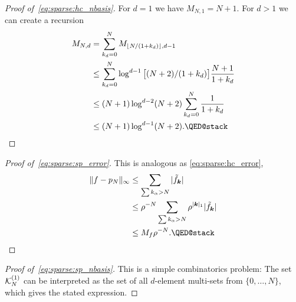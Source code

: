 \begin{proof}[Proof of~\eqref{eq:sparse:hc_nbasis}]
    For $d = 1$ we have $M_{N,1} = N+1$. For $d > 1$ we can create a 
    recursion 
    \begin{align*}
        M_{N,d} 
        &= \sum_{k_{d} = 0}^N M_{\lfloor N/(1+k_d) \rfloor, d-1} \\ 
        &\leq \sum_{k_d = 0}^N \log^{d-1} \b[ (N+2)/(1+k_d) \b] \frac{N+1}{1+k_d} \\ 
        &\leq (N+1) \log^{d-2} (N+2) \sum_{k_d = 0}^N \frac{1}{1+k_d} \\ 
        &\leq (N+1) \log^{d-1} (N+2).  \qedhere 
    \end{align*}
\end{proof}

\begin{proof}[Proof of~\ref{eq:sparse:sp_error}]
    This is analogous as  \eqref{eq:sparse:hc_error}, 
    \begin{align*}
        \|f - p_N\|_\infty 
        &\leq \sum_{\sum k_\alpha > N} |\tilde{f}_\bk| \\ 
        &\leq \rho^{-N} \sum_{\sum k_\alpha > N} \rho^{|\bk|_1} |\tilde{f}_\bk| \\ 
        &\leq M_f \rho^{-N}. \qedhere 
    \end{align*}
\end{proof}
\begin{proof}[Proof of~\eqref{eq:sparse:sp_nbasis}]
    This is a simple combinatorics problem: The set $\mathcal{K}_N^{(1)}$ can be 
    interpreted as the set of all $d$-element multi-sets from 
    $\{0, \dots, N\}$, which gives the stated expression. 
\end{proof}


